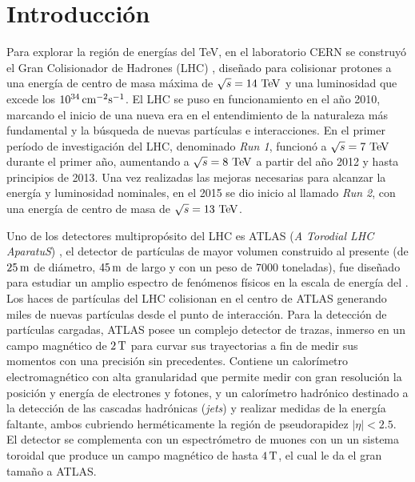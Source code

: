 \chapter*{Introducción}

Para explorar la región de energías del TeV, en el laboratorio CERN se
construyó el Gran Colisionador de Hadrones (LHC) \cite{Evans:1129806},
diseñado para colisionar protones a una energía de centro de masa máxima de
$\sqrt{s} = 14 \tev$ y una luminosidad que excede los $\unit[10^{34}]{cm^{-2}s^{-1}}$.
El LHC se puso en funcionamiento en el a\~no 2010, marcando el inicio de
una nueva era en el entendimiento de la naturaleza más fundamental y la
búsqueda de nuevas partículas e interacciones. En el primer período de
investigación del LHC, denominado \emph{Run 1}, funcionó a $\sqrt{s}=7\tev$ durante el
primer a\~no, aumentando a
$\sqrt{s}=8\tev$ a partir del a\~no 2012 y hasta principios de 2013. Una vez
realizadas las mejoras necesarias para alcanzar la energía y luminosidad
nominales, en el 2015 se dio inicio al llamado \emph{Run 2}, con una energía de centro
de masa de $\sqrt{s} = 13 \tev$.

Uno de los detectores multipropósito del LHC es ATLAS (\emph{A Torodial LHC
  AparatuS}) \cite{atlas}, el detector de partículas de mayor volumen construido
al presente (de $\unit[25]{m}$ de diámetro, $\unit[45]{m}$ de largo y con un
peso de 7000 toneladas), fue dise\~nado para estudiar un amplio espectro de
fen\'omenos físicos en la escala de energía del {\tev}. Los haces de partículas
del LHC colisionan en el centro de ATLAS generando miles de nuevas partículas
desde el punto de interacción. Para la detección de partículas cargadas, ATLAS
posee un complejo detector de trazas, inmerso en un campo magnético de
$\unit[2]{T}$ para curvar sus trayectorias a fin de medir sus momentos con una
precisión sin precedentes. Contiene un calorímetro electromagnético con alta
granularidad que permite medir con gran resolución la posición y energía de
electrones y fotones, y un calorímetro hadrónico destinado a la detección de las
cascadas hadrónicas (\emph{jets}) y realizar medidas de la energía faltante,
ambos cubriendo herméticamente la región de pseudorapidez $|\eta|<2.5$. El
detector se complementa con un espectrómetro de muones con un un sistema
toroidal que produce un campo magnético de hasta $\unit[4]{T}$, el cual le da el
gran tamaño a ATLAS.


